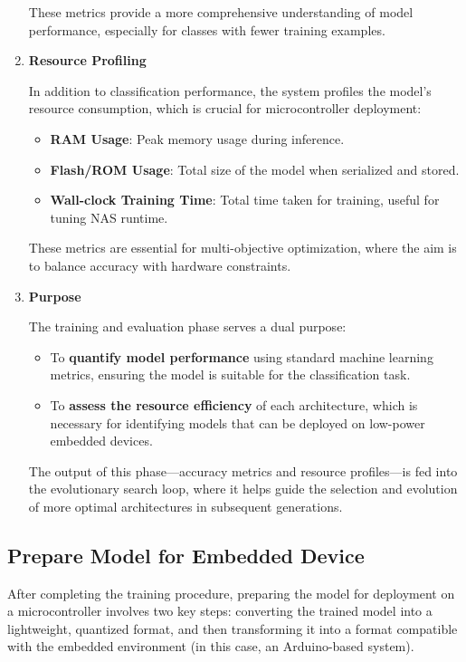 \begin{enumerate}
\begin{itemize}
\end{itemize}

These metrics provide a more comprehensive understanding of model performance, especially for classes with fewer training examples.

\item \textbf{Resource Profiling}

In addition to classification performance, the system profiles the model’s resource consumption, which is crucial for microcontroller deployment:
\begin{itemize}
    \item \textbf{RAM Usage}: Peak memory usage during inference.
    \item \textbf{Flash/ROM Usage}: Total size of the model when serialized and stored.
    \item \textbf{Wall-clock Training Time}: Total time taken for training, useful for tuning NAS runtime.
\end{itemize}

These metrics are essential for multi-objective optimization, where the aim is to balance accuracy with hardware constraints.
\item \textbf{Purpose}

The training and evaluation phase serves a dual purpose:
\begin{itemize}
    \item To \textbf{quantify model performance} using standard machine learning metrics, ensuring the model is suitable for the classification task.
    \item To\textbf{ assess the resource efficiency }of each architecture, which is necessary for identifying models that can be deployed on low-power embedded devices.
\end{itemize}

The output of this phase—accuracy metrics and resource profiles—is fed into the evolutionary search loop, where it helps guide the selection and evolution of more optimal architectures in subsequent generations.


    
\end{enumerate}


\subsection{Prepare Model for Embedded Device}

After completing the training procedure, preparing the model for deployment on a microcontroller involves two key steps: converting the trained model into a lightweight, quantized format, and then transforming it into a format compatible with the embedded environment (in this case, an Arduino-based system).

